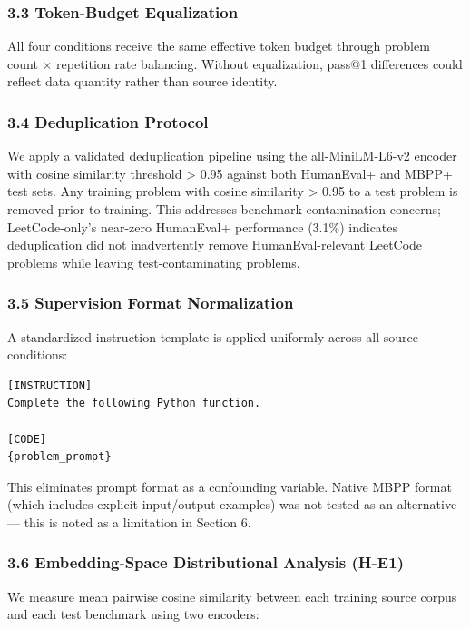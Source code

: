 \subsubsection{3.3 Token-Budget Equalization}

All four conditions receive the same effective token budget through problem count $\times$ repetition rate balancing. Without equalization, pass@1 differences could reflect data quantity rather than source identity.

\subsubsection{3.4 Deduplication Protocol}

We apply a validated deduplication pipeline using the all-MiniLM-L6-v2 encoder with cosine similarity threshold > 0.95 against both HumanEval+ and MBPP+ test sets. Any training problem with cosine similarity > 0.95 to a test problem is removed prior to training. This addresses benchmark contamination concerns; LeetCode-only's near-zero HumanEval+ performance (3.1\%) indicates deduplication did not inadvertently remove HumanEval-relevant LeetCode problems while leaving test-contaminating problems.

\subsubsection{3.5 Supervision Format Normalization}

A standardized instruction template is applied uniformly across all source conditions:

\begin{verbatim}
[INSTRUCTION]
Complete the following Python function.

[CODE]
{problem_prompt}
\end{verbatim}

This eliminates prompt format as a confounding variable. Native MBPP format (which includes explicit input/output examples) was not tested as an alternative --- this is noted as a limitation in Section 6.

\subsubsection{3.6 Embedding-Space Distributional Analysis (H-E1)}

We measure mean pairwise cosine similarity between each training source corpus and each test benchmark using two encoders:

